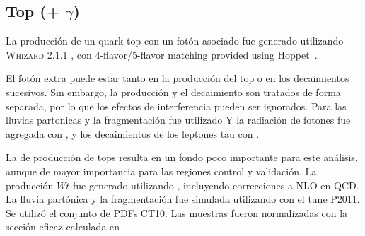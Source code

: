 \subsection{Top (+ $\gamma$)}

La producción de un quark top con un fotón asociado fue generado utilizando
\textsc{Whizard} 2.1.1 \cite{whizard, whizard2}, con 4-flavor/5-flavor matching provided
using Hoppet~\cite{hoppet}.

El fotón extra puede estar tanto en la producción del top o en los decaimientos
sucesivos. Sin embargo, la producción y el decaimiento son tratados de forma
separada, por lo que los efectos de interferencia pueden ser ignorados. Para las
lluvias partonicas y la fragmentación fue utilizado {\pythia}\cite{pythia} Y la
radiación de fotones fue agregada con {\photos}\cite{photos}, y los
decaimientos de los leptones tau con {\tauola}\cite{tauola}.

La de producción de tops resulta en un fondo poco importante para este análisis,
aunque de mayor importancia para las regiones control y validación. La producción $Wt$
fue generado utilizando {\powheg}, incluyendo correcciones a NLO en QCD. La lluvia
partónica y la fragmentación fue simulada utilizando {\pythia} con el tune
P2011. Se utilizó el conjunto de PDFs CT10. Las muestras fueron normalizadas con
la sección eficaz calculada en \cite{Kidonakis:2010ux}.

